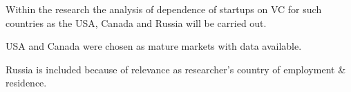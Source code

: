 \vspace{0.5cm}
Within the research the analysis of dependence of startups on VC for such countries as the USA, Canada and Russia will be carried out.

USA and Canada were chosen as mature markets with data available.

Russia is included because of relevance as researcher's country of employment \& residence.